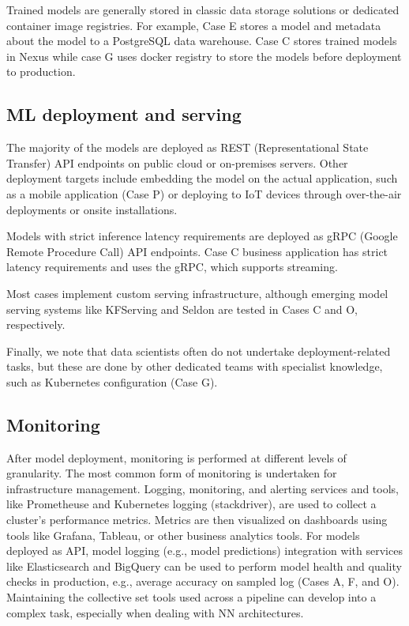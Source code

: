 Trained models are generally stored in classic data storage solutions or dedicated container image registries. For example, Case E stores a model and metadata about the model to a PostgreSQL data warehouse. Case C stores trained models in Nexus while case G uses docker registry to store the models before deployment to production.



\subsection{ML deployment and serving}
The majority of the models are deployed as REST (Representational State Transfer) API endpoints on public cloud or on-premises servers. Other deployment targets include embedding the model on the actual application, such as a mobile application (Case P) or deploying to IoT devices through over-the-air deployments or onsite installations.

Models with strict inference latency requirements are deployed as gRPC (Google Remote Procedure Call) API endpoints. Case C business application has strict latency requirements and uses the gRPC, which supports streaming.

Most cases implement custom serving infrastructure, although emerging model serving systems like KFServing and Seldon are tested in Cases C and O, respectively. 

Finally, we note that data scientists often do not undertake deployment-related tasks, but these are done by other dedicated teams with specialist knowledge, such as Kubernetes configuration (Case G).

\subsection{Monitoring}
After model deployment, monitoring is performed at different levels of granularity. The most common form of monitoring is undertaken for infrastructure management. Logging, monitoring, and alerting services and tools, like Prometheuse and Kubernetes logging (stackdriver), are used to collect a cluster's performance metrics. Metrics are then visualized on dashboards using tools like Grafana, Tableau, or other business analytics tools. For models deployed as API, model logging (e.g., model predictions) integration with services like Elasticsearch and BigQuery can be used to perform model health and quality checks in production, e.g., average accuracy on sampled log (Cases A, F, and O).
Maintaining the collective set tools used across a pipeline can develop into a complex task, especially when dealing with NN architectures.


